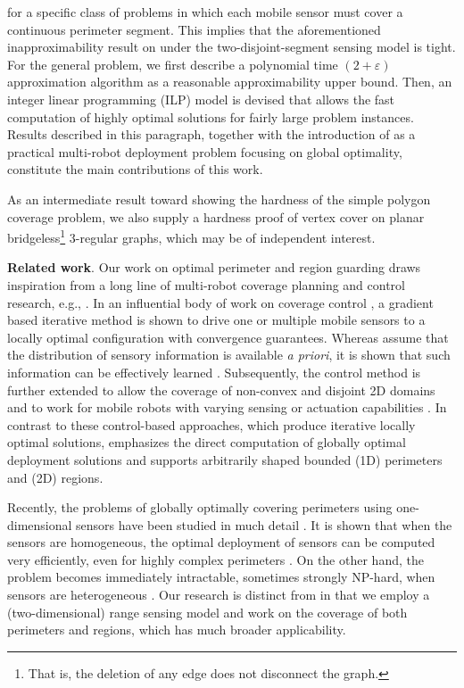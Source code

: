 for a specific class of \opgt problems in which each mobile 
sensor must cover a continuous perimeter segment. This implies that the 
aforementioned inapproximability result on \opgt under the 
two-disjoint-segment sensing model is tight. 
%
For the general \osgt problem, we first describe a polynomial time 
$(2+\varepsilon)$ approximation algorithm as a reasonable approximability 
upper bound. 
%
Then, an integer linear programming (ILP) model is devised that allows 
the fast computation of highly optimal solutions for fairly large 
problem instances. 
%
Results described in this paragraph, together with the introduction 
of \osgt as a practical multi-robot deployment problem focusing on global 
optimality, constitute the main contributions of this work. 

As an intermediate result toward showing the hardness of the simple polygon
coverage problem, we also supply a hardness proof of vertex cover 
on planar bridgeless\footnote{That is, the deletion of any edge does not disconnect 
the graph.} $3$-regular graphs, which may be of independent interest. 

\textbf{Related work}. Our work on optimal perimeter and region guarding 
draws inspiration from a long line of multi-robot coverage planning and 
control research, e.g., \cite{cortes2004coverage,martinez2007motion,
schwager2009optimal,pavone2009equitable,schwager2009decentralized,
pierson2017adapting}. 
%
In an influential body of work on coverage control \cite{cortes2004coverage,
martinez2007motion}, a gradient based iterative method is shown to drive 
one or multiple mobile sensors to a locally optimal configuration with 
convergence guarantees. 
%
Whereas \cite{cortes2004coverage,martinez2007motion} assume that the 
distribution of sensory information is available {\em a priori}, it is 
shown that such information can be effectively learned 
\cite{schwager2009decentralized}. 
%
Subsequently, the control method is further extended to allow the 
coverage of non-convex and disjoint 2D domains \cite{schwager2009optimal} 
and to work for mobile robots with varying sensing or actuation capabilities
\cite{pierson2017adapting}. 
%
In contrast to these control-based approaches, which produce iterative 
locally optimal solutions, \osgt emphasizes the direct computation of 
globally optimal deployment solutions and supports arbitrarily shaped
bounded (1D) perimeters and (2D) regions.

Recently, the problems of globally optimally covering perimeters using 
one-dimensional sensors have been studied in much detail 
\cite{fenghangaoyu2019efficient,fengyu2020RAL}. It is shown that when the sensors 
are homogeneous, the optimal deployment of sensors can be computed 
very efficiently, even for highly complex perimeters \cite{fenghangaoyu2019efficient}.
On the other hand, the problem becomes immediately intractable, sometimes
strongly NP-hard, when sensors are heterogeneous \cite{fengyu2020RAL}. 
Our research is distinct from \cite{fenghangaoyu2019efficient,fengyu2020RAL} in that 
we employ a (two-dimensional) range sensing model and work on the coverage 
of both perimeters and regions, which has much broader applicability. 

